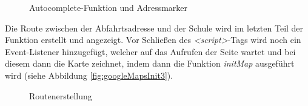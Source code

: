 \begin{figure}[!bh]
	\caption{Autocomplete-Funktion und Adressmarker}
	\label{fig:googleMapsInit2}
\end{figure}

Die Route zwischen der Abfahrtsadresse und der Schule wird im letzten Teil der Funktion erstellt und angezeigt. Vor Schließen des \textit{<script>}-Tags wird noch ein Event-Listener hinzugefügt, welcher auf das Aufrufen der Seite wartet und bei diesem dann die Karte zeichnet, indem dann die Funktion \textit{initMap} ausgeführt wird (siehe Abbildung \vref{fig:googleMapsInit3}).

\begin{figure}[!bh]
	\caption{Routenerstellung}
	\label{fig:googleMapsInit3}
\end{figure}

